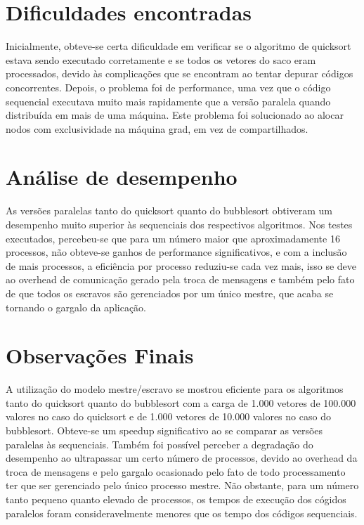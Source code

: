 \documentclass{article}
\begin{document}
\begin{multicols*}{2}
\section{Dificuldades encontradas}
Inicialmente, obteve-se certa dificuldade em verificar se o algoritmo de quicksort estava sendo executado corretamente e se todos os vetores do saco eram processados, devido às complicações que se encontram ao tentar depurar códigos concorrentes. Depois, o problema foi de performance, uma vez que o código sequencial executava muito mais rapidamente que a versão paralela quando distribuída em mais de uma máquina. Este problema foi solucionado ao alocar nodos com exclusividade na máquina grad, em vez de compartilhados.

\section{Análise de desempenho}
 As versões paralelas tanto do quicksort quanto do bubblesort obtiveram um desempenho muito superior às sequenciais dos respectivos algoritmos. Nos testes executados, percebeu-se que para um número maior que aproximadamente 16 processos, não obteve-se ganhos de performance significativos, e com a inclusão de mais processos, a eficiência por processo reduziu-se cada vez mais, isso se deve ao overhead de comunicação gerado pela troca de mensagens e também pelo fato de que todos os escravos são gerenciados por um único mestre, que acaba se tornando o gargalo da aplicação.

\section{Observações Finais}
A utilização do modelo mestre/escravo se mostrou eficiente para os algoritmos tanto do quicksort quanto do bubblesort com a carga de 1.000 vetores de 100.000 valores no caso do quicksort e de 1.000 vetores de 10.000 valores no caso do bubblesort. Obteve-se um speedup significativo ao se comparar as versões paralelas às sequenciais. Também foi possível perceber a degradação do desempenho ao ultrapassar um certo número de processos, devido ao overhead da troca de mensagens e pelo gargalo ocasionado pelo fato de todo processamento ter que ser gerenciado pelo único processo mestre. Não obstante, para um número tanto pequeno quanto elevado de processos, os tempos de execução dos cógidos paralelos foram consideravelmente menores que os tempo dos códigos sequenciais.

\end{multicols*}

\newpage



\newpage


\end{document}
